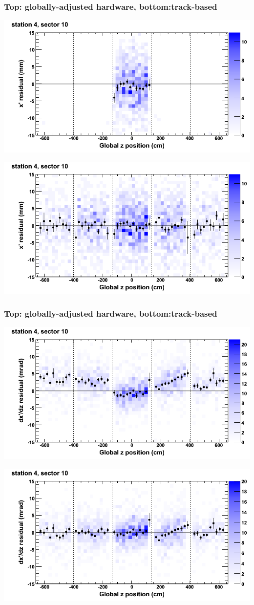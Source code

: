 \documentclass[compress]{beamer}
\begin{document}
\begin{frame}
\frametitle{Top: globally-adjusted hardware, bottom:track-based}
\includegraphics[width=0.7\linewidth]{NOV4_mapplots_HW/DTvsz_st4sec10_x.png}

\includegraphics[width=0.7\linewidth]{NOV4_mapplots/DTvsz_st4sec10_x.png}
\end{frame}

\begin{frame}
\frametitle{Top: globally-adjusted hardware, bottom:track-based}
\includegraphics[width=0.7\linewidth]{NOV4_mapplots_HW/DTvsz_st4sec10_dxdz.png}

\includegraphics[width=0.7\linewidth]{NOV4_mapplots/DTvsz_st4sec10_dxdz.png}
\end{frame}
\end{document}
